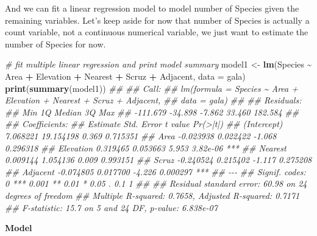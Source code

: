 \documentclass[
]{book}
\newenvironment{Shaded}{\begin{snugshade}}{\end{snugshade}}
\newcommand{\CommentTok}[1]{\textcolor[rgb]{0.56,0.35,0.01}{\textit{#1}}}
\newcommand{\DataTypeTok}[1]{\textcolor[rgb]{0.13,0.29,0.53}{#1}}
\newcommand{\KeywordTok}[1]{\textcolor[rgb]{0.13,0.29,0.53}{\textbf{#1}}}
\newcommand{\NormalTok}[1]{#1}
\newcommand{\OperatorTok}[1]{\textcolor[rgb]{0.81,0.36,0.00}{\textbf{#1}}}
\newcommand{\StringTok}[1]{\textcolor[rgb]{0.31,0.60,0.02}{#1}}
\theoremstyle{definition}
\theoremstyle{definition}
\theoremstyle{definition}
\theoremstyle{remark}
\begin{document}
And we can fit a linear regression model to model number of Species given the remaining variables. Let's keep aside for now that number of Species is actually a count variable, not a continuous numerical variable, we just want to estimate the number of Species for now.

\begin{Shaded}
\begin{Highlighting}[]
\CommentTok{\# fit multiple linear regression and print model summary}
\NormalTok{model1 \textless{}{-}}\StringTok{ }\KeywordTok{lm}\NormalTok{(Species }\OperatorTok{\textasciitilde{}}\StringTok{ }\NormalTok{Area }\OperatorTok{+}\StringTok{ }\NormalTok{Elevation }\OperatorTok{+}\StringTok{ }\NormalTok{Nearest }\OperatorTok{+}\StringTok{ }\NormalTok{Scruz }\OperatorTok{+}\StringTok{ }\NormalTok{Adjacent, }\DataTypeTok{data =}\NormalTok{ gala)}
\KeywordTok{print}\NormalTok{(}\KeywordTok{summary}\NormalTok{(model1))}
\CommentTok{\#\# }
\CommentTok{\#\# Call:}
\CommentTok{\#\# lm(formula = Species \textasciitilde{} Area + Elevation + Nearest + Scruz + Adjacent, }
\CommentTok{\#\#     data = gala)}
\CommentTok{\#\# }
\CommentTok{\#\# Residuals:}
\CommentTok{\#\#      Min       1Q   Median       3Q      Max }
\CommentTok{\#\# {-}111.679  {-}34.898   {-}7.862   33.460  182.584 }
\CommentTok{\#\# }
\CommentTok{\#\# Coefficients:}
\CommentTok{\#\#              Estimate Std. Error t value Pr(\textgreater{}|t|)    }
\CommentTok{\#\# (Intercept)  7.068221  19.154198   0.369 0.715351    }
\CommentTok{\#\# Area        {-}0.023938   0.022422  {-}1.068 0.296318    }
\CommentTok{\#\# Elevation    0.319465   0.053663   5.953 3.82e{-}06 ***}
\CommentTok{\#\# Nearest      0.009144   1.054136   0.009 0.993151    }
\CommentTok{\#\# Scruz       {-}0.240524   0.215402  {-}1.117 0.275208    }
\CommentTok{\#\# Adjacent    {-}0.074805   0.017700  {-}4.226 0.000297 ***}
\CommentTok{\#\# {-}{-}{-}}
\CommentTok{\#\# Signif. codes:  0 \textquotesingle{}***\textquotesingle{} 0.001 \textquotesingle{}**\textquotesingle{} 0.01 \textquotesingle{}*\textquotesingle{} 0.05 \textquotesingle{}.\textquotesingle{} 0.1 \textquotesingle{} \textquotesingle{} 1}
\CommentTok{\#\# }
\CommentTok{\#\# Residual standard error: 60.98 on 24 degrees of freedom}
\CommentTok{\#\# Multiple R{-}squared:  0.7658,	Adjusted R{-}squared:  0.7171 }
\CommentTok{\#\# F{-}statistic:  15.7 on 5 and 24 DF,  p{-}value: 6.838e{-}07}
\end{Highlighting}
\end{Shaded}

\textbf{Model}
\end{document}
